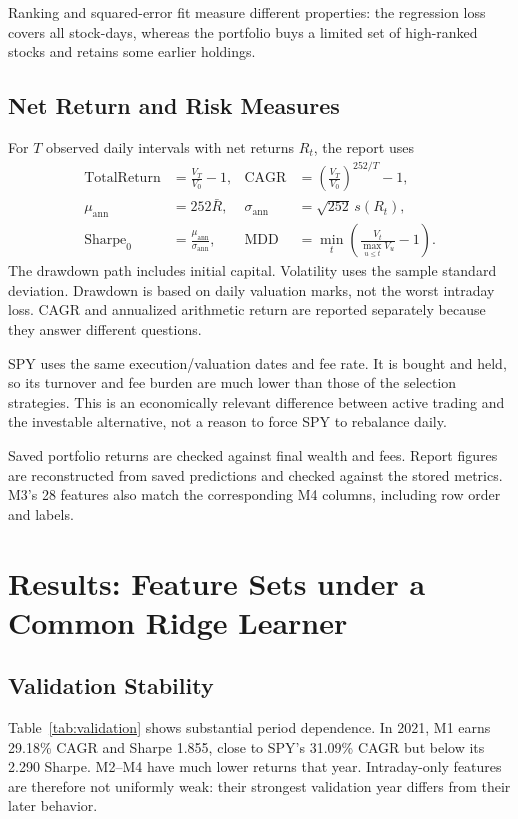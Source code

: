 \documentclass[11pt,a4paper]{article}
\newcommand{\tbl}[3]{\begin{table}[htbp]\centering\small
\caption{#2}\label{#3}#1\end{table}}
\begin{document}
Ranking and squared-error fit measure different properties: the regression
loss covers all stock-days, whereas the portfolio buys a limited set of
high-ranked stocks and retains some earlier holdings.

\subsection{Net Return and Risk Measures}
For $T$ observed daily intervals with net returns $R_t$, the report uses
\begin{align}
\mathrm{TotalReturn}&=\frac{V_T}{V_0}-1,&
\mathrm{CAGR}&=\left(\frac{V_T}{V_0}\right)^{252/T}-1,\\
\mu_{\mathrm{ann}}&=252\bar R,&
\sigma_{\mathrm{ann}}&=\sqrt{252}\,s(R_t),\\
\mathrm{Sharpe}_{0}&=\frac{\mu_{\mathrm{ann}}}{\sigma_{\mathrm{ann}}},&
\mathrm{MDD}&=\min_t\left(\frac{V_t}{\max_{u\le t}V_u}-1\right).
\end{align}
The drawdown path includes initial capital. Volatility uses the sample
standard deviation. Drawdown is based on daily valuation marks, not the worst
intraday loss. CAGR and annualized arithmetic return are reported separately
because they answer different questions.

SPY uses the same execution/valuation dates and fee rate. It is
bought and held, so its turnover and fee burden are much lower than those of
the selection strategies. This is an economically relevant difference between
active trading and the investable alternative, not a reason to force SPY to
rebalance daily.

Saved portfolio returns are checked against final wealth and fees. Report
figures are reconstructed from saved predictions and checked against the
stored metrics. M3's 28 features also match the corresponding M4 columns,
including row order and labels.

\section{Results: Feature Sets under a Common Ridge Learner}
\label{sec:mainresults}
\subsection{Validation Stability}
\tbl{\ValidationTable}{Validation CAGR in percent and Sharpe ratio at 5 bps per side.
Each year is a separate forward fold.}{tab:validation}


Table~\ref{tab:validation} shows substantial
period dependence. In 2021, M1 earns 29.18\% CAGR and Sharpe 1.855, close to
SPY's 31.09\% CAGR but below its 2.290 Sharpe. M2--M4 have much lower returns
that year. Intraday-only features are therefore not uniformly weak: their
strongest validation year differs from their later behavior.
\end{document}

